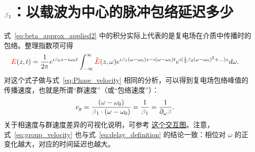 \section[beta1：以载波为中心的脉冲包络延迟多少]{$\betag_1$：以载波为中心的脉冲包络延迟多少}
式~\ref{eq:beta_approx_applied2} 中的积分实际上代表的是复电场在介质中传播时的包络。整理指数项可得
\begin{align}
\label{eq:envelope_beta1}
    \E(z,t) &= \frac{1}{2\pi} e^{i\betag_0z-i\omega_0t}  \int_{-\infty}^{\infty} \Tilde{\E}(z,\omega) e^{i\betag_1(\omega-\omega_0)z-i(\omega-\omega_0) t} e^{i(\frac{1}{2}\betag_2(\omega-\omega_0)^2+...)z} d\omega.
\end{align}
对这个式子做与式~\ref{eq:Phase_velocity} 相同的分析，可以得到复电场包络峰值的传播速度，也就是所谓“群速度”（或“包络速度”）：
\begin{align}
\label{eq:group_velocity}
    v_g &= \frac{(\omega-\omega_0)}{\betag_1\cdot(\omega-\omega_0)} = \frac{1}{\betag_1} = \frac{1}{\partial_\omega\betag}.
\end{align}
关于相速度与群速度差异的可视化说明，可参考 \href{https://www.desmos.com/calculator/rq2physwac}{这个交互图}。注意，式~\ref{eq:group_velocity} 也与式~\ref{eq:delay_definition} 的结论一致：相位对 $\omega$ 的正变化越大，对应的时间延迟也越大。




